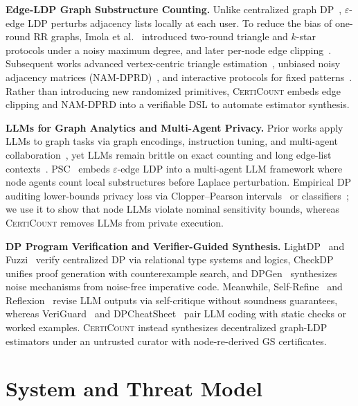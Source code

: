 \documentclass[conference]{IEEEtran}
\newlength{\ieeeindent}
\newcommand{\parhead}[1]{\par\noindent\hspace*{\ieeeindent}\textbf{#1}}
\theoremstyle{ieeeitalic}
\newcommand{\GS}{\mathrm{GS}}
\begin{document}
\parhead{Edge-LDP Graph Substructure Counting.}
Unlike centralized graph DP~\cite{dwork2014algorithmic}, $\varepsilon$-edge LDP perturbs adjacency lists locally at each user. To reduce the bias of one-round RR graphs, Imola et al.~\cite{imola2021locally} introduced two-round triangle and $k$-star protocols under a noisy maximum degree, and later per-node edge clipping~\cite{imola2022communication}. Subsequent works advanced vertex-centric triangle estimation~\cite{he2025robust}, unbiased noisy adjacency matrices (NAM-DPRD)~\cite{guo2025nam}, and interactive protocols for fixed patterns~\cite{chen2026power}. Rather than introducing new randomized primitives, \textsc{CertiCount} embeds edge clipping and NAM-DPRD into a verifiable DSL to automate estimator synthesis.

\parhead{LLMs for Graph Analytics and Multi-Agent Privacy.}
Prior works apply LLMs to graph tasks via graph encodings, instruction tuning, and multi-agent collaboration~\cite{wang2023can,chen2024graphwiz,hu2024scalable}, yet LLMs remain brittle on exact counting and long edge-list contexts~\cite{liu2023lost}. PSC~\cite{zhang2026psc} embeds $\varepsilon$-edge LDP into a multi-agent LLM framework where node agents count local substructures before Laplace perturbation. Empirical DP auditing lower-bounds privacy loss via Clopper--Pearson intervals~\cite{jagielski2020auditing} or classifiers~\cite{bichsel2021dpsniper}; we use it to show that node LLMs violate nominal sensitivity bounds, whereas \textsc{CertiCount} removes LLMs from private execution.

\parhead{DP Program Verification and Verifier-Guided Synthesis.}
LightDP~\cite{zhang2017lightdp} and Fuzzi~\cite{zhang2019fuzzi} verify centralized DP via relational type systems and logics, CheckDP~\cite{wang2020checkdp} unifies proof generation with counterexample search, and DPGen~\cite{wang2021dpgen} synthesizes noise mechanisms from noise-free imperative code. Meanwhile, Self-Refine~\cite{madaan2023selfrefine} and Reflexion~\cite{shinn2023reflexion} revise LLM outputs via self-critique without soundness guarantees, whereas VeriGuard~\cite{miculicich2025veriguard} and DPCheatSheet~\cite{chu2025dpcheatsheet} pair LLM coding with static checks or worked examples. \textsc{CertiCount} instead synthesizes decentralized graph-LDP estimators under an untrusted curator with node-re-derived $\GS$ certificates.

\section{System and Threat Model}
\label{sec:model}
\end{document}
